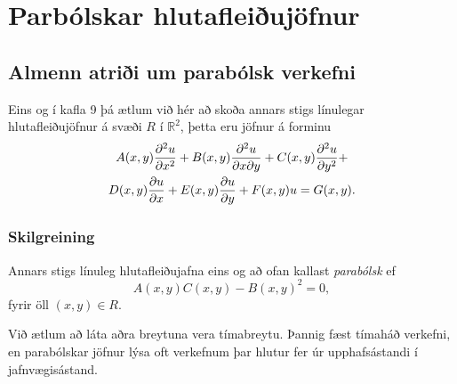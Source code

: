 \documentclass[icelandic,a4paper,12pt]{article}
\newcommand{\R}{{\mathbb  R}}
\begin{document}
\section{Parbólskar hlutafleiðujöfnur}



\subsection{Almenn atriði um parabólsk verkefni}

Eins og í kafla 9 þá ætlum við hér að skoða annars stigs línulegar 
hlutafleiðujöfnur á svæði $R$ í $\R^2$, \pause þetta eru jöfnur á forminu
\begin{multline}
A(x,y)\frac{{\partial}^2 u}{{\partial} x^2} + B(x,y)\frac{{\partial}^2 u}{{\partial} x{\partial} y} + C(x,y)\frac{{\partial}^2 u}{{\partial} y^2} +\\
D(x,y)\frac{{\partial} u}{{\partial} x} + E(x,y)\frac{{\partial} u}{{\partial} y} + F(x,y)u = G(x,y).
\end{multline}
\subsubsection{Skilgreining}
 Annars stigs línuleg hlutafleiðujafna eins og að ofan kallast \emph{parabólsk}
 ef 
 $$
  A(x,y)C(x,y) - B(x,y)^2 = 0,
 $$
 fyrir öll $(x,y) \in R$.

 Við ætlum að láta aðra breytuna vera tímabreytu. 
 Þannig fæst tímaháð verkefni, en parabólskar jöfnur lýsa oft verkefnum þar 
 hlutur fer úr upphafsástandi í jafnvægisástand. \pause
 
\end{document}

